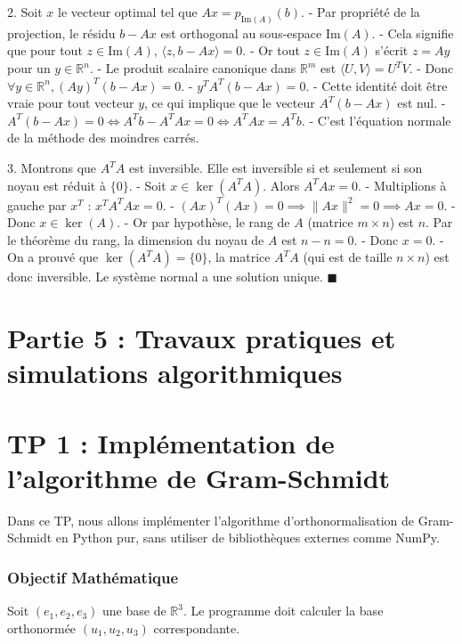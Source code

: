 \documentclass{report}
\begin{document}
2. Soit $x$ le vecteur optimal tel que $Ax = p_{\text{Im}(A)}(b)$.
   - Par propriété de la projection, le résidu $b - Ax$ est orthogonal au sous-espace $\text{Im}(A)$.
   - Cela signifie que pour tout $z \in \text{Im}(A)$, $\langle z, b - Ax \rangle = 0$.
   - Or tout $z \in \text{Im}(A)$ s'écrit $z = Ay$ pour un $y \in \mathbb{R}^n$.
   - Le produit scalaire canonique dans $\mathbb{R}^m$ est $\langle U, V \rangle = U^T V$.
   - Donc $\forall y \in \mathbb{R}^n, (Ay)^T (b - Ax) = 0$.
   - $y^T A^T (b - Ax) = 0$.
   - Cette identité doit être vraie pour tout vecteur $y$, ce qui implique que le vecteur $A^T(b - Ax)$ est nul.
   - $A^T(b - Ax) = 0 \iff A^T b - A^T A x = 0 \iff A^T A x = A^T b$.
   - C'est l'équation normale de la méthode des moindres carrés.

3. Montrons que $A^T A$ est inversible. Elle est inversible si et seulement si son noyau est réduit à $\{0\}$.
   - Soit $x \in \ker(A^T A)$. Alors $A^T A x = 0$.
   - Multiplions à gauche par $x^T$ : $x^T A^T A x = 0$.
   - $(Ax)^T (Ax) = 0 \implies \|Ax\|^2 = 0 \implies Ax = 0$.
   - Donc $x \in \ker(A)$.
   - Or par hypothèse, le rang de $A$ (matrice $m \times n$) est $n$. Par le théorème du rang, la dimension du noyau de $A$ est $n - n = 0$.
   - Donc $x = 0$.
   - On a prouvé que $\ker(A^T A) = \{0\}$, la matrice $A^T A$ (qui est de taille $n \times n$) est donc inversible. Le système normal a une solution unique.
   $\blacksquare$

\newpage
\chapter*{Partie 5 : Travaux pratiques et simulations algorithmiques}


\chapter*{TP 1 : Implémentation de l'algorithme de Gram-Schmidt}

Dans ce TP, nous allons implémenter l'algorithme d'orthonormalisation de Gram-Schmidt en Python pur, sans utiliser de bibliothèques externes comme NumPy.

\subsection*{Objectif Mathématique}
Soit $(e_1, e_2, e_3)$ une base de $\mathbb{R}^3$. Le programme doit calculer la base orthonormée $(u_1, u_2, u_3)$ correspondante.
\end{document}
